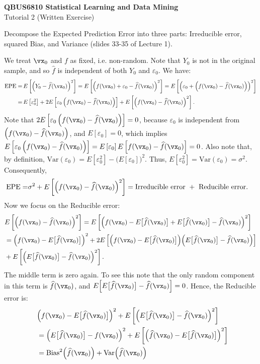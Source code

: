 \documentclass[12pt, answers]{exam}
\def\eps{\varepsilon}
\def\var{\text{Var}}
\def\fhat{\widehat{f}}
\def\({\left(}
\def\){\right)}
\begin{document}
\begin{center}
{\Large \textbf{QBUS6810 Statistical Learning and Data Mining}}\\ \large{Tutorial 2 (Written Exercise)}
\end{center}




\noindent Decompose the Expected Prediction Error into three parts: Irreducible error, squared Bias, and Variance (slides 33-35 of Lecture 1).

\begin{solution}
We treat $\vx_0$ and $f$ as fixed, i.e. non-random.  Note that $Y_0$ is not in the original sample, and so $\fhat$ is independent of both $Y_0$ and $\eps_0$.  We have:
\begin{align*}
\text{EPE}=&\,E\left[\(Y_0-\fhat(\vx_0)\)^2\right] = E\left[\(f(\vx_0)+\eps_0-\fhat(\vx_0)\)^2\right] = E\left[\(\eps_0+\(f(\vx_0)-\fhat(\vx_0)\)\)^2\right]\\
=&\,E\left[\eps_0^2\right]+2E\left[\eps_0\(f(\vx_0)-\fhat(\vx_0)\)\right]+E\left[\(f(\vx_0)-\fhat(\vx_0)\)^2\right].
\end{align*}
Note that $2E\left[\eps_0\(f(\vx_0)-\fhat(\vx_0)\)\right]=0$, because $\eps_0$ is independent from~$\(f(\vx_0)-\fhat(\vx_0)\)$, and $E\left[\eps_0\right]=0$, which implies $E\left[\eps_0\(f(\vx_0)-\fhat(\vx_0)\)\right]=E\left[\eps_0\right]E\left[f(\vx_0)-\fhat(\vx_0)\right]=0$.  Also note that, by definition, $\var\left(\eps_0\right)=E\left[\eps^2_0\right]-\Big(E\left[\eps_0\right]\Big)^2$.  Thus, $E\left[\eps_0^2\right]=\var\left(\eps_0\right)=\sigma^2$.  Consequently,
\begin{align*}
\text{EPE}=&\sigma^2+E\left[\(f(\vx_0)-\fhat(\vx_0)\)^2\right]=\text{Irreducible error }+\text{ Reducible error}.
\end{align*}
Now we focus on the Reducible error:
\begin{align*}
&E\left[\(f(\vx_0)-\fhat(\vx_0)\)^2\right]=E\left[\Big(f(\vx_0)-E\big[\fhat(\vx_0)\big]+E\big[\fhat(\vx_0)\big]-\fhat(\vx_0)\Big)^2\right]\\
&=\Big(f(\vx_0)-E\big[\fhat(\vx_0)\big]\Big)^2+2E\left[\Big(f(\vx_0)-E\big[\fhat(\vx_0)\big]\Big)\Big(E\big[\fhat(\vx_0)\big]-\fhat(\vx_0)\Big)\right]\\
&+E\left[\Big(E\big[\fhat(\vx_0)\big]-\fhat(\vx_0)\Big)^2\right].
\end{align*}
The middle term is zero again.  To see this note that the only random component in this term is $\fhat(\vx_0)$, and $E\Big[E\big[\fhat(\vx_0)\big]-\fhat(\vx_0)\Big]=0$.  Hence, the Reducible error is:
\begin{align*}
&\Big(f(\vx_0)-E\big[\fhat(\vx_0)\big]\Big)^2+E\left[\Big(E\big[\fhat(\vx_0)\big]-\fhat(\vx_0)\Big)^2\right]\\
\;\;&=\Big(E\big[\fhat(\vx_0)\big]-f(\vx_0)\Big)^2+E\left[\Big(\fhat(\vx_0)-E\big[\fhat(\vx_0)\big]\Big)^2\right]\\
\;\;&=\text{Bias}^2\Big(\fhat(\vx_0)\Big)+\var\Big(\fhat(\vx_0)\Big)
\end{align*}


\end{solution}
\end{document}
